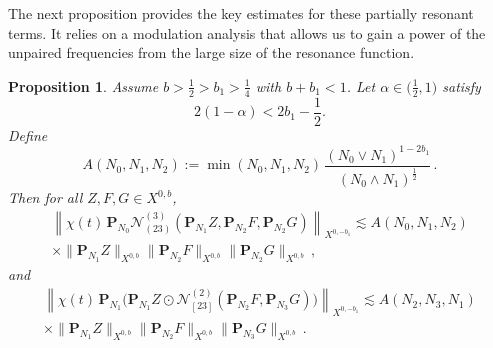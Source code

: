\documentclass[11pt,reqno,english]{amsart}
\numberwithin{equation}{section}
\theoremstyle{plain}
\newtheorem{proposition}[theorem]{Proposition}
\theoremstyle{definition}
\theoremstyle{remark}
\newcommand{\dotcirc}{\mathbin{\odot}}
\begin{document}
The next proposition provides the key estimates for these partially resonant terms. It relies on a modulation analysis that allows us to gain a power of the unpaired frequencies from the large size of the resonance function.

\begin{proposition}\label{linear:type1}
	Assume $b>\frac{1}{2}>b_1>\frac{1}{4}$ with $b+b_1<1$. Let $\alpha\in\big(\frac{1}{2},1\big)$ satisfy
	\[
	2(1-\alpha)<2b_1-\frac{1}{2}.
	\]
	Define
	\[
	A(N_0,N_1,N_2):= \min(N_0,N_1,N_2)\, \frac{(N_0\vee N_1)^{1-2b_1}}{(N_0 \wedge N_1)^{\frac{1}{2}}}\,.
	\]
	Then for all $Z,F,G\in X^{0,b}$,
	\begin{multline}
		\label{resonant:1}
		\left\|
		\chi(t)\,\mathbf{P}_{N_0}\mathcal{N}_{(23)}^{(3)}(\mathbf{P}_{N_1}Z,\mathbf{P}_{N_2}F,\mathbf{P}_{N_2}G)
		\right\|_{X^{0,-b_1}}
		\lesssim A(N_0,N_1,N_2)\\
		\times\|\mathbf{P}_{N_1}Z\|_{X^{0,b}}\|\mathbf{P}_{N_2}F\|_{X^{0,b}}\|\mathbf{P}_{N_2}G\|_{X^{0,b}}\,,
	\end{multline}
	and
	\begin{multline}\label{resonant:2}
		\left\|
		\chi(t)\,\mathbf{P}_{N_1}
        \big(
		\mathbf{P}_{N_1}Z\dotcirc\mathcal{N}_{[23]}^{(2)}(\mathbf{P}_{N_2}F,\mathbf{P}_{N_3}G)
		\big)
		\right\|_{X^{0,-b_1}}
		\lesssim A(N_2,N_3,N_1)
		\\
		\times\|\mathbf{P}_{N_1}Z\|_{X^{0,b}}\|\mathbf{P}_{N_2}F\|_{X^{0,b}}\|\mathbf{P}_{N_3}G\|_{X^{0,b}}\,.
	\end{multline}
\end{proposition}
\end{document}
